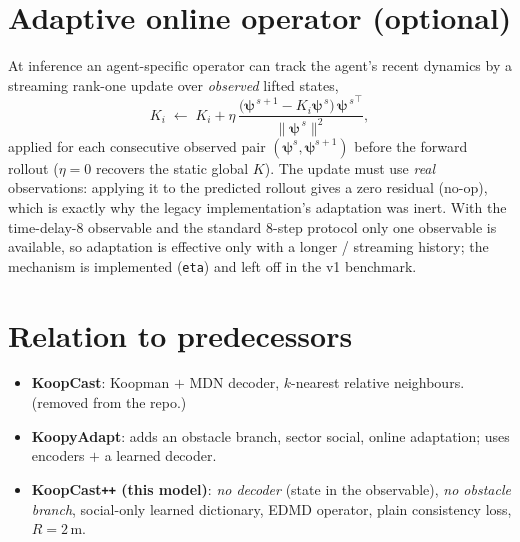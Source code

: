 \documentclass[11pt]{article}
\newcommand{\psib}{\bm{\psi}}
\newcommand{\Kop}{K}
\begin{document}
\section{Adaptive online operator (optional)}
At inference an agent-specific operator can track the agent's recent dynamics by
a streaming rank-one update over \emph{observed} lifted states,
\[
  \Kop_i \;\leftarrow\; \Kop_i + \eta\,
  \frac{\big(\psib^{\,s+1}-\Kop_i\psib^{\,s}\big)\,{\psib^{\,s}}^{\!\top}}
       {\lVert\psib^{\,s}\rVert^2},
\]
applied for each consecutive observed pair $(\psib^{s},\psib^{s+1})$ before the
forward rollout ($\eta{=}0$ recovers the static global $\Kop$). The update must
use \emph{real} observations: applying it to the predicted rollout gives a zero
residual (no-op), which is exactly why the legacy implementation's adaptation
was inert. With the time-delay-$8$ observable and the standard $8$-step protocol
only one observable is available, so adaptation is effective only with a longer
/ streaming history; the mechanism is implemented (\texttt{eta}) and left off in
the v1 benchmark.

\section{Relation to predecessors}
\begin{itemize}[nosep]
  \item \textbf{KoopCast}: Koopman $+$ MDN decoder, $k$-nearest relative
        neighbours. (removed from the repo.)
  \item \textbf{KoopyAdapt}: adds an obstacle branch, sector social, online
        adaptation; uses encoders $+$ a learned decoder.
  \item \textbf{KoopCast\texttt{++} (this model)}: \emph{no decoder} (state in
        the observable), \emph{no obstacle branch}, social-only learned
        dictionary, EDMD operator, plain consistency loss, $R=2$\,m.
\end{itemize}
\end{document}

